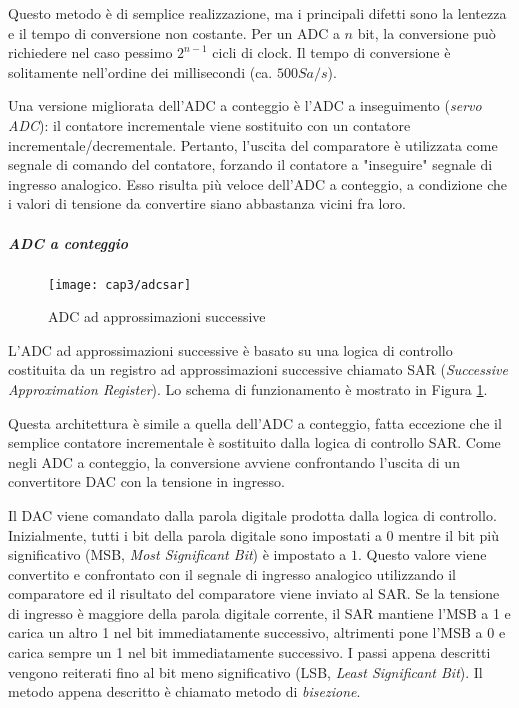 Questo metodo è di semplice realizzazione, ma i principali difetti sono la lentezza e il tempo di conversione non costante. Per un ADC a $n$ bit, la conversione può richiedere nel caso pessimo $2^{n-1}$ cicli di clock. Il tempo di conversione è solitamente nell'ordine dei millisecondi (ca. $500 Sa/s$).

Una versione migliorata dell'ADC a conteggio è l'ADC a inseguimento (\textit{servo ADC}): il contatore incrementale viene sostituito con un contatore incrementale/decrementale. Pertanto, l'uscita del comparatore è utilizzata come segnale di comando del contatore, forzando il contatore a "inseguire" segnale di ingresso analogico. Esso risulta più veloce dell'ADC a conteggio, a condizione che i valori di tensione da convertire siano abbastanza vicini fra loro.

\subparagraph{\textbf{ADC a conteggio}}
\begin{figure}  
  \begin{center}
    \texttt{[image: cap3/adcsar]}
    \caption{ADC ad approssimazioni successive}
    \label{adcsar}
  \end{center}
\end{figure}
L'ADC ad approssimazioni successive è basato su una logica di controllo costituita da un registro ad approssimazioni successive chiamato SAR (\textit{Successive Approximation Register}). Lo schema di funzionamento è mostrato in Figura \ref{adcsar}.

Questa architettura è simile a quella dell'ADC a conteggio, fatta eccezione che il semplice contatore incrementale è sostituito dalla logica di controllo SAR. Come negli ADC a conteggio, la conversione avviene confrontando l'uscita di un convertitore DAC con la tensione in ingresso.

Il DAC viene comandato dalla parola digitale prodotta dalla logica di controllo. Inizialmente, tutti i bit della parola digitale sono impostati a 0 mentre il bit più significativo (MSB, \textit{Most Significant Bit}) è impostato a $1$. Questo valore viene convertito e confrontato con il segnale di ingresso analogico utilizzando il comparatore ed il risultato del comparatore viene inviato al SAR. Se la tensione di ingresso è maggiore della parola digitale corrente, il SAR mantiene l'MSB a 1 e carica un altro 1 nel bit immediatamente successivo, altrimenti pone l'MSB a 0 e carica sempre un 1 nel bit immediatamente successivo. I passi appena descritti vengono reiterati fino al bit meno significativo (LSB, \textit{Least Significant Bit}). Il metodo appena descritto è chiamato metodo di \textit{bisezione}.

